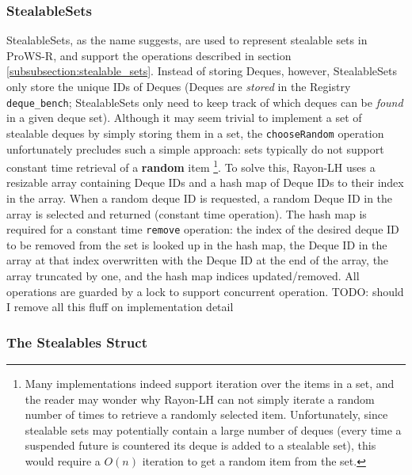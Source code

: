 \documentclass[bsc,frontabs,singlespacing,parskip,deptreport,normalheadings]{infthesis}
\begin{document}
\subsubsection*{StealableSets}

StealableSets, as the name suggests, are used to represent stealable sets in
ProWS-R, and support the operations described in section
\ref{subsubsection:stealable_sets}. Instead of storing Deques, however,
StealableSets only store the unique IDs of Deques (Deques are \textit{stored} in
the Registry \texttt{deque\_bench}; StealableSets only need to keep track of
which deques can be \textit{found} in a given deque set). Although it may seem
trivial to implement a set of stealable deques by simply storing them in a set,
the \texttt{chooseRandom} operation unfortunately precludes such a simple
approach: sets typically do not support constant time retrieval of a
\textbf{random} item \footnote{Many implementations indeed support iteration
    over the items in a set, and the reader may wonder why Rayon-LH can not
    simply iterate a random number of times to retrieve a randomly selected
    item. Unfortunately, since stealable sets may potentially contain a large
    number of deques (every time a suspended future is countered its deque is
    added to a stealable set), this would require a \(O(n)\) iteration to get a
random item from the set.}. To solve this, Rayon-LH uses a resizable array
containing Deque IDs and a hash map of Deque IDs to their index in the
array. When a random deque ID is requested, a random Deque ID in the array
is selected and returned (constant time operation). The hash map is required for
a constant time \texttt{remove} operation: the index of the desired deque ID to
be removed from the set is looked up in the hash map, the Deque ID in the array
at that index overwritten with the Deque ID at the end of the array, the array
truncated by one, and the hash map indices updated/removed. All operations are
guarded by a lock to support concurrent operation. TODO: should I remove all
this fluff on implementation detail

\subsubsection*{The Stealables Struct}
\end{document}
